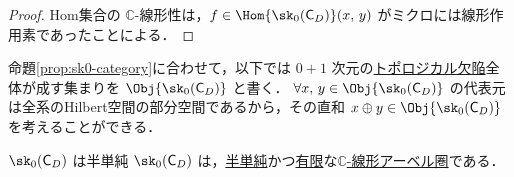 \documentclass[TQFT_main]{subfiles}
\begin{document}
\begin{proof}
    Hom集合の $\mathbb{C}$-線形性は，$f \in \Hom{\sk_0(\mathsf{C}_D)}(x,\, y)$ がミクロには線形作用素であったことによる．
\end{proof}

命題\ref{prop:sk0-category}に合わせて，以下では $0+1$ 次元の\hyperref[def:TD]{トポロジカル欠陥}全体が成す集まりを $\Obj{\sk_0(\mathsf{C}_D)}$ と書く．
$\forall x,\, y \in \Obj{\sk_0(\mathsf{C}_D)}$ の代表元は全系のHilbert空間の部分空間であるから，その直和 $x \oplus y \in \Obj{\sk_0(\mathsf{C}_D)}$ を考えることができる．

\begin{mypropph}[label=prop:sk0-category]{$\sk_0(\mathsf{C}_D)$ は半単純}
    $\sk_0(\mathsf{C}_D)$ は，\hyperref[def:semisimple-cat]{半単純}かつ\hyperref[def:finite-abcat]{有限}な\hyperref[def:additive-cat]{$\mathbb{C}$-線形アーベル圏}である．
\end{mypropph}
\end{document}
